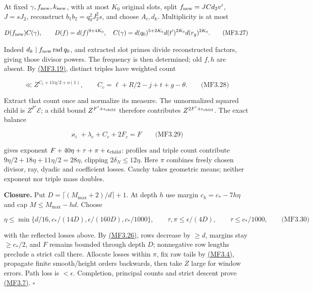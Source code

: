 At fixed \(\gamma,f_{\rm new},k_{\rm new}\), with at most \(K_0\) original slots, split \(f_{\rm new}=JCd_2v'\), \(J=sJ_2\), reconstruct \(b_1b_2=q_0^2J_2^2s\), and choose \(A_i,d_k\). Multiplicity is at most

\hypertarget{mf:eq:B3.27}{}

\label{mf:eq:B3.27}

\[
D(f_{\rm new})C(\gamma),\qquad
D(f)=d(f)^{9+4K_0},\quad
C(\gamma)=d(q_0)^{5+2K_0}d(t')^{2K_0}d(r_g)^{2K_0}.
\qquad\text{(MF3.27)}
\]

Indeed \(d_k\mid f_{\rm new}\operatorname{rad}q_0\), and extracted slot primes divide reconstructed factors, giving those divisor powers. The frequency is then determined; old \(f,h\) are absent. By \protect\hyperlink{mf:eq:B3.19}{(MF3.19)}, distinct triples have weighted count

\hypertarget{mf:eq:B3.28}{}

\label{mf:eq:B3.28}

\[
\ll Z^{C_c+11\eta/2+o(1)},\qquad
C_c=\ell+R/2-j+t+g-\theta.
\qquad\text{(MF3.28)}
\]

Extract that count once and normalize its measure. The unnormalized squared child is \(Z^{F'}\mathcal E\); a child bound \(Z^{F'+\epsilon_{\rm child}}\) therefore contributes \(Z^{2F'+\epsilon_{\rm child}}\). The exact balance

\hypertarget{mf:eq:B3.29}{}

\label{mf:eq:B3.29}

\[
\varkappa_i+\lambda_c+C_c+2F_c=F
\qquad\text{(MF3.29)}
\]

gives exponent \(F+40\eta+\tau+\pi+\epsilon_{\rm child}\): profiles and triple count contribute \(9\eta/2+18\eta+11\eta/2=28\eta\), clipping \(2\delta_N\le12\eta\). Here \(\pi\) combines freely chosen divisor, ray, dyadic and coefficient losses. Cauchy takes geometric means; neither exponent nor triple mass doubles.

\textbf{Closure.} Put \(D=\lceil(M_{\max}+2)/d\rceil+1\). At depth \(h\) use margin \(c_h=c_*-7h\eta\) and cap \(M\le M_{\max}-hd\). Choose

\hypertarget{mf:eq:B3.30}{}

\label{mf:eq:B3.30}

\[
\eta\le\min\{d/16,c_*/(14D),\epsilon/(160D),c_*/1000\},
\qquad\tau,\pi\le\epsilon/(4D),\qquad
\tau\le c_*/1000,
\qquad\text{(MF3.30)}
\]

with the reflected losses above. By \protect\hyperlink{mf:eq:B3.26}{(MF3.26)}, rows decrease by \(\ge d\), margins stay \(\ge c_*/2\), and \(F\) remains bounded through depth \(D\); nonnegative row lengths preclude a strict call there. Allocate losses within \(\pi\), fix raw tails by \protect\hyperlink{mf:eq:B3.4}{(MF3.4)}, propagate finite smooth/height orders backwards, then take \(Z\) large for window errors. Path loss is \(<\epsilon\). Completion, principal counts and strict descent prove \protect\hyperlink{mf:eq:B3.7}{(MF3.7)}. \(\square\)

